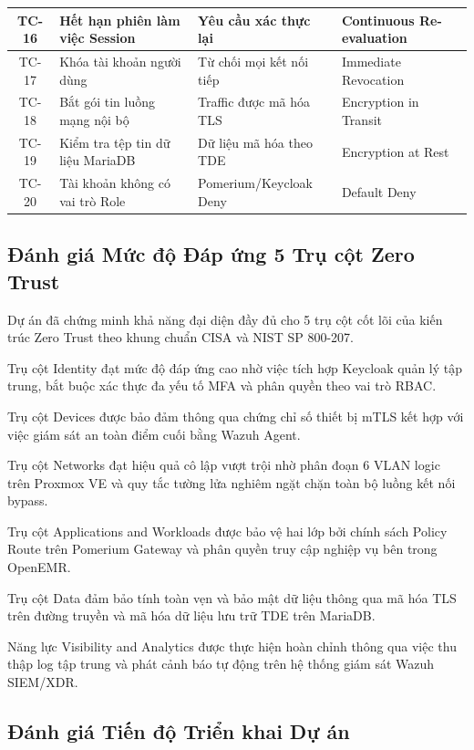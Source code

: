 \begin{longtable}{| c | >{\raggedright\arraybackslash}p{4.6cm} | >{\raggedright\arraybackslash}p{4.4cm} | >{\raggedright\arraybackslash}p{4.1cm} |}
TC-16 & Hết hạn phiên làm việc Session & Yêu cầu xác thực lại & Continuous Re-evaluation \\ \hline
TC-17 & Khóa tài khoản người dùng & Từ chối mọi kết nối tiếp & Immediate Revocation \\ \hline
TC-18 & Bắt gói tin luồng mạng nội bộ & Traffic được mã hóa TLS & Encryption in Transit \\ \hline
TC-19 & Kiểm tra tệp tin dữ liệu MariaDB & Dữ liệu mã hóa theo TDE & Encryption at Rest \\ \hline
TC-20 & Tài khoản không có vai trò Role & Pomerium/Keycloak Deny & Default Deny \\ \hline
\end{longtable}
\endgroup

\subsection{Đánh giá Mức độ Đáp ứng 5 Trụ cột Zero Trust}

Dự án đã chứng minh khả năng đại diện đầy đủ cho 5 trụ cột cốt lõi của kiến trúc Zero Trust theo khung chuẩn CISA và NIST SP 800-207.

Trụ cột Identity đạt mức độ đáp ứng cao nhờ việc tích hợp Keycloak quản lý tập trung, bắt buộc xác thực đa yếu tố MFA và phân quyền theo vai trò RBAC.

Trụ cột Devices được bảo đảm thông qua chứng chỉ số thiết bị mTLS kết hợp với việc giám sát an toàn điểm cuối bằng Wazuh Agent.

Trụ cột Networks đạt hiệu quả cô lập vượt trội nhờ phân đoạn 6 VLAN logic trên Proxmox VE và quy tắc tường lửa nghiêm ngặt chặn toàn bộ luồng kết nối bypass.

Trụ cột Applications and Workloads được bảo vệ hai lớp bởi chính sách Policy Route trên Pomerium Gateway và phân quyền truy cập nghiệp vụ bên trong OpenEMR.

Trụ cột Data đảm bảo tính toàn vẹn và bảo mật dữ liệu thông qua mã hóa TLS trên đường truyền và mã hóa dữ liệu lưu trữ TDE trên MariaDB.

Năng lực Visibility and Analytics được thực hiện hoàn chỉnh thông qua việc thu thập log tập trung và phát cảnh báo tự động trên hệ thống giám sát Wazuh SIEM/XDR.

\subsection{Đánh giá Tiến độ Triển khai Dự án}

